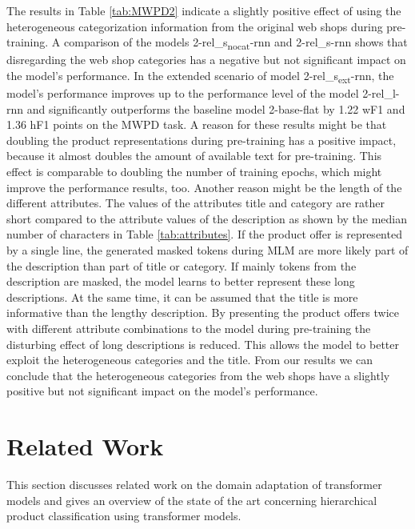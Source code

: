 \documentclass[11pt,dvipdfm]{article}
\begin{document}
The results in Table \ref{tab:MWPD2} indicate a slightly positive effect of using the heterogeneous categorization information from the original web shops during pre-training.
A comparison of the models 2-rel\_s\textsubscript{nocat}-rnn and 2-rel\_s-rnn shows that disregarding the web shop categories has a negative but not significant impact on the model's performance.
In the extended scenario of model 2-rel\_s\textsubscript{ext}-rnn, the model's performance improves up to the performance level of the model 2-rel\_l-rnn and significantly outperforms the baseline model 2-base-flat by 1.22 \ac{wF1} and 1.36 \ac{hF1} points on the \ac{MWPD} task. 
A reason for these results might be that doubling the product representations during pre-training has a positive impact, because it almost doubles the amount of available text for pre-training.
This effect is comparable to doubling the number of training epochs, which might improve the performance results, too.
Another reason might be the length of the different attributes.
The values of the attributes title and category are rather short compared to the attribute values of the description as shown by the median number of characters in Table \ref{tab:attributes}.
If the product offer is represented by a single line, the generated masked tokens during \ac{MLM} are more likely part of the description than part of title or category.
If mainly tokens from the description are masked, the model learns to better represent these long descriptions.
At the same time, it can be assumed that the title is more informative than the lengthy description.
By presenting the product offers twice with different attribute combinations to the model during pre-training the disturbing effect of long descriptions is reduced.
This allows the model to better exploit the heterogeneous categories and the title.
From our results we can conclude that the heterogeneous categories from the web shops have a slightly positive but not significant impact on the model's performance.

\section{Related Work}
\label{sec:rel_work}

This section discusses related work on the domain adaptation of transformer models and gives an overview of the state of the art concerning hierarchical product classification using transformer models.
\end{document}
